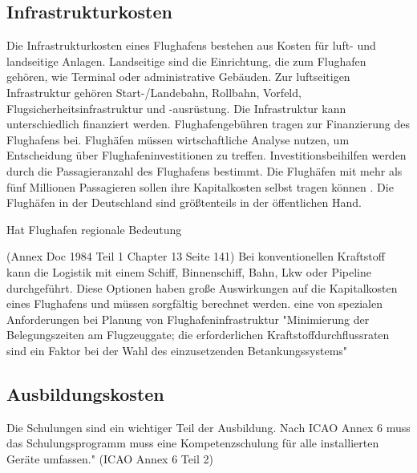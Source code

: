 
\subsection{Infrastrukturkosten}


Die Infrastrukturkosten eines Flughafens bestehen aus Kosten für luft- und landseitige Anlagen. Landseitige sind die Einrichtung, die zum Flughafen
gehören, wie Terminal oder administrative Gebäuden. Zur luftseitigen Infrastruktur gehören Start-/Landebahn, Rollbahn, Vorfeld, 
Flugsicherheitsinfrastruktur und -ausrüstung. Die Infrastruktur kann unterschiedlich finanziert werden.
Flughafengebühren tragen zur Finanzierung des Flughafens bei.
Flughäfen müssen wirtschaftliche Analyse nutzen, um Entscheidung über Flughafeninvestitionen zu treffen. %
Investitionsbeihilfen werden durch die Passagieranzahl des Flughafens bestimmt. Die Flughäfen mit mehr als fünf Millionen Passagieren
sollen ihre Kapitalkosten selbst tragen können \cite{conrady2019luftverkehr}. 
Die Flughäfen in der Deutschland sind größtenteils in der öffentlichen Hand.

Hat Flughafen regionale Bedeutung

(Annex  Doc 1984 Teil 1 Chapter 13 Seite 141)
Bei konventionellen Kraftstoff kann die Logistik mit einem Schiff, Binnenschiff, Bahn, Lkw oder Pipeline durchgeführt. 
Diese Optionen haben große Auswirkungen auf die Kapitalkosten eines Flughafens und müssen sorgfältig berechnet werden. 
eine von spezialen Anforderungen bei Planung von Flughafeninfrastruktur "Minimierung der Belegungszeiten am Flugzeuggate; 
die erforderlichen Kraftstoffdurchflussraten sind ein Faktor bei der Wahl des einzusetzenden Betankungssystems"

\subsection{Ausbildungskosten}

Die Schulungen sind ein wichtiger Teil der Ausbildung. 
Nach ICAO Annex 6 muss das Schulungsprogramm muss eine Kompetenzschulung für alle installierten Geräte umfassen." (ICAO Annex 6 Teil 2)